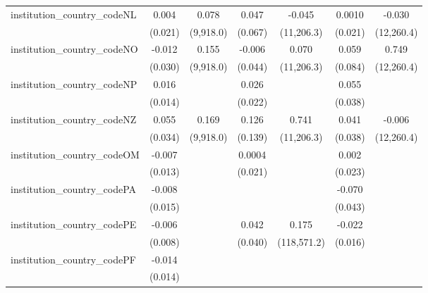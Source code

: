 \begin{tabular}{lcccccc}
   institution\_country\_codeNL          & 0.004          & 0.078         & 0.047         & -0.045       & 0.0010       & -0.030\\   
                                         & (0.021)        & (9,918.0)     & (0.067)       & (11,206.3)   & (0.021)      & (12,260.4)\\   
   institution\_country\_codeNO          & -0.012         & 0.155         & -0.006        & 0.070        & 0.059        & 0.749\\   
                                         & (0.030)        & (9,918.0)     & (0.044)       & (11,206.3)   & (0.084)      & (12,260.4)\\   
   institution\_country\_codeNP          & 0.016          &               & 0.026         &              & 0.055        &   \\   
                                         & (0.014)        &               & (0.022)       &              & (0.038)      &   \\   
   institution\_country\_codeNZ          & 0.055          & 0.169         & 0.126         & 0.741        & 0.041        & -0.006\\   
                                         & (0.034)        & (9,918.0)     & (0.139)       & (11,206.3)   & (0.038)      & (12,260.4)\\   
   institution\_country\_codeOM          & -0.007         &               & 0.0004        &              & 0.002        &   \\   
                                         & (0.013)        &               & (0.021)       &              & (0.023)      &   \\   
   institution\_country\_codePA          & -0.008         &               &               &              & -0.070       &   \\   
                                         & (0.015)        &               &               &              & (0.043)      &   \\   
   institution\_country\_codePE          & -0.006         &               & 0.042         & 0.175        & -0.022       &   \\   
                                         & (0.008)        &               & (0.040)       & (118,571.2)  & (0.016)      &   \\   
   institution\_country\_codePF          & -0.014         &               &               &              &              &   \\   
                                         & (0.014)        &               &               &              &              &   \\   

\end{tabular}

